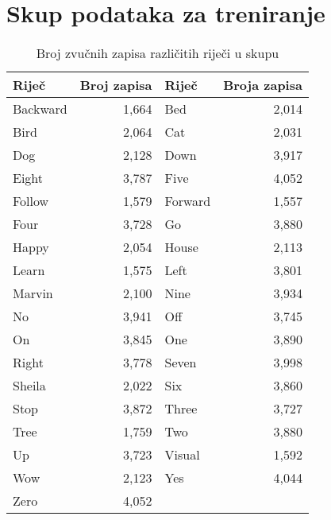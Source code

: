 \chapter{Skup podataka za treniranje}


\begin{table}[htb]
    \centering
    \begin{tabular}{|l|r|l|r|}
        \hline
        \textbf{Riječ} & \textbf{Broj zapisa} & \textbf{Riječ} & \textbf{Broja zapisa} \\ \hline
        Backward & 1,664 & Bed & 2,014 \\ \hline
        Bird & 2,064 & Cat & 2,031 \\ \hline
        Dog & 2,128 & Down & 3,917 \\ \hline
        Eight & 3,787 & Five & 4,052 \\ \hline
        Follow & 1,579 & Forward & 1,557 \\ \hline
        Four & 3,728 & Go & 3,880 \\ \hline
        Happy & 2,054 & House & 2,113 \\ \hline
        Learn & 1,575 & Left & 3,801 \\ \hline
        Marvin & 2,100 & Nine & 3,934 \\ \hline
        No & 3,941 & Off & 3,745 \\ \hline
        On & 3,845 & One & 3,890 \\ \hline
        Right & 3,778 & Seven & 3,998 \\ \hline
        Sheila & 2,022 & Six & 3,860 \\ \hline
        Stop & 3,872 & Three & 3,727 \\ \hline
        Tree & 1,759 & Two & 3,880 \\ \hline
        Up & 3,723 & Visual & 1,592 \\ \hline
        Wow & 2,123 & Yes & 4,044 \\ \hline
        Zero & 4,052 & & \\ \hline
        \end{tabular}
    \caption{Broj zvučnih zapisa različitih riječi u skupu \cite{speechcommandsv2}}
    \label{tab:word_frequency}
\end{table}